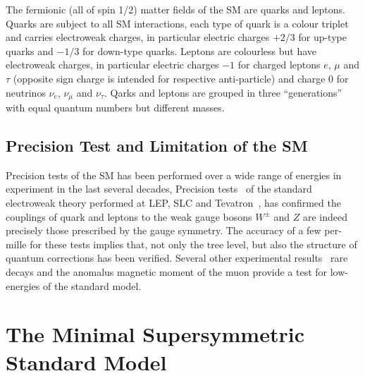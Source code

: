 The fermionic (all of spin 1/2) matter fields of the SM are quarks and leptons. 
Quarks  are subject to all SM interactions, each type of quark is a colour triplet and carries 
electroweak charges, in particular electric charges $+2/3$ for up-type quarks and $-1/3$
for down-type quarks.  Leptons are colourless
but have electroweak charges, in particular electric charges $-1$ for charged leptons $e$, $\mu$ and $\tau$ (opposite sign charge 
is intended for respective anti-particle)  and charge 0 for neutrinos $\nu_e$, $\nu_{\mu}$ and $\nu_{\tau}$.
Qarks and leptons are grouped in three  ``generations'' with equal quantum numbers but different masses.

\subsection{Precision Test and Limitation of the SM}

Precision tests of the SM has been performed over a wide range of energies in experiment in the last several decades,
Precision tests~\cite{precisiontest} of the standard electroweak theory performed at LEP, SLC and Tevatron~\cite{smtest}, 
has confirmed the couplings of quark and leptons to the weak gauge bosons $W^{\pm}$  and $Z$ are indeed
precisely those prescribed by the gauge symmetry. The accuracy of a few per-mille for these
tests implies that, not only the tree level, but also the structure of quantum corrections has
been verified. Several other experimental results~\cite{pdg} rare decays and the anomalus magnetic moment of the muon
provide a test for low-energies of the standard model.

%
%

 
\section{The Minimal Supersymmetric Standard Model}
